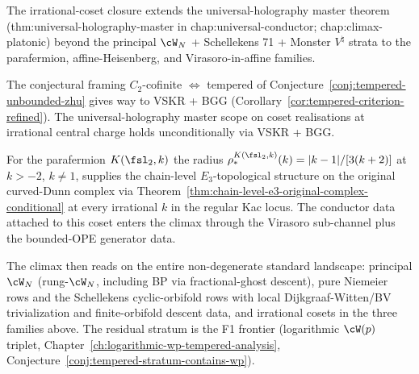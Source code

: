 \begin{remark}%
\label{rem:anchor-irrational-cosets}%
%
%
%
The irrational-coset closure extends the universal-holography master
theorem (\textsf{thm:universal-holography-master} in
\textsf{chap:universal-conductor}; \textsf{chap:climax-platonic})
beyond the principal $\cW_N$ + Schellekens 71 + Monster $V^\natural$
strata to the parafermion, affine-Heisenberg, and Virasoro-in-affine
families.

The conjectural framing $C_2$-cofinite $\Leftrightarrow$ tempered of
Conjecture~\ref{conj:tempered-unbounded-zhu} gives way to VSKR + BGG
(Corollary~\ref{cor:tempered-criterion-refined}). The
universal-holography master scope on coset realisations at irrational
central charge holds unconditionally via VSKR + BGG.

For the parafermion $K(\fsl_2, k)$ the radius
$\rho_*^{K(\fsl_2,k)}(k) = |k - 1|/[3(k+2)]$ at $k > -2$, $k \ne 1$,
supplies the chain-level $E_3$-topological structure on the original
curved-Dunn complex via
Theorem~\ref{thm:chain-level-e3-original-complex-conditional} at
every irrational $k$ in the regular Kac locus. The conductor data
attached to this coset enters the climax through the Virasoro
sub-channel plus the bounded-OPE generator data.

The climax then reads on the entire non-degenerate standard
landscape: principal $\cW_N$ (rung-$\cW_N$, including BP via
fractional-ghost descent), pure Niemeier rows and the Schellekens
cyclic-orbifold rows with local Dijkgraaf-Witten/BV trivialization
and finite-orbifold descent data, and irrational cosets in the three
families above. The residual stratum is the F1 frontier (logarithmic
$\cW(p)$ triplet, Chapter~\ref{ch:logarithmic-wp-tempered-analysis},
Conjecture~\ref{conj:tempered-stratum-contains-wp}).
\end{remark}
